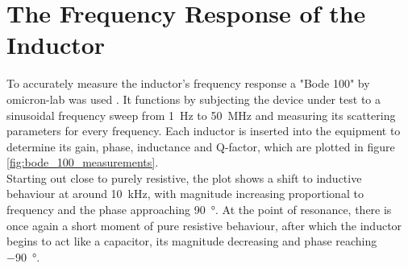 \section{The Frequency Response of the Inductor} \label{sec:the_frequency_response_of_the_inductor}
To accurately measure the inductor's frequency response a "Bode 100" by omicron-lab was used \cite{omicronlabBode100Bode2024}. It functions by subjecting the device under test to a sinusoidal frequency sweep from \SI{1}{\Hz} to \SI{50}{\mega\Hz} and measuring its scattering parameters for every frequency. Each inductor is inserted into the equipment to determine its gain, phase, inductance and \ac{Q-factor}, which are plotted in figure \ref{fig:bode_100_measurements}.\\
Starting out close to purely resistive, the plot shows a shift to inductive behaviour at around \SI{10}{\kilo\Hz}, with magnitude increasing proportional to frequency and the phase approaching \SI{90}{\degree}. At the point of resonance, there is once again a short moment of pure resistive behaviour, after which the inductor begins to act like a capacitor, its magnitude decreasing and phase reaching \SI{-90}{\degree}.\\
